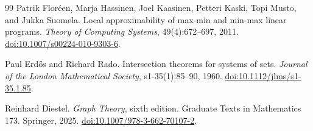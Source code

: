 \documentclass[11pt,a4paper]{article}
\theoremstyle{definition}
\theoremstyle{remark}
\begin{document}
\begin{thebibliography}{99}
Patrik Flor{\'e}en, Marja Hassinen, Joel Kaasinen, Petteri Kaski,
Topi Musto, and Jukka Suomela.
Local approximability of max-min and min-max linear programs.
\emph{Theory of Computing Systems}, 49(4):672--697, 2011.
\href{https://doi.org/10.1007/s00224-010-9303-6}{doi:10.1007/s00224-010-9303-6}.

Paul Erd{\H o}s and Richard Rado.
Intersection theorems for systems of sets.
\emph{Journal of the London Mathematical Society}, s1-35(1):85--90, 1960.
\href{https://doi.org/10.1112/jlms/s1-35.1.85}{doi:10.1112/jlms/s1-35.1.85}.

Reinhard Diestel.
\emph{Graph Theory}, sixth edition.
Graduate Texts in Mathematics 173. Springer, 2025.
\href{https://doi.org/10.1007/978-3-662-70107-2}{doi:10.1007/978-3-662-70107-2}.

\end{thebibliography}
\end{document}
